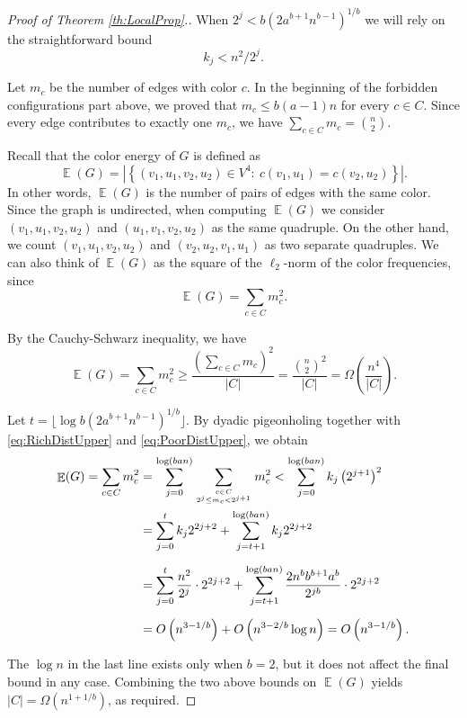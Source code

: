 \documentclass[11pt]{article}
\newcommand{\parag}[1]{\vspace{2mm}

\noindent{\bf #1} }
\DeclareMathOperator*{\EE}{\mathbb{E}}
\begin{document}
\begin{proof}[Proof of Theorem \ref{th:LocalProp}.]
When $2^j< b(2a^{b+1}n^{b-1})^{1/b}$ we will rely on the straightforward bound
%
\begin{equation} \label{eq:PoorDistUpper}
k_j < n^2/2^j.
\end{equation}

\parag{An energy argument.}
Let $m_c$ be the number of edges with color $c$.
In the beginning of the forbidden configurations part above, we proved that $m_c \le b(a-1)n$ for every $c\in C$.
Since every edge contributes to exactly one $m_c$, we have $\sum_{c\in C} m_c = \binom{n}{2}$.

Recall that the color energy of $G$ is defined as
%
\begin{equation*}
\EE(G) = \left|\left\{(v_1,u_1,v_2,u_2)\in V^{4} :\ c(v_1,u_1)=c(v_2,u_2)\right\}\right|.
\end{equation*}
%
In other words, $\EE(G)$ is the number of pairs of edges with the same color.
Since the graph is undirected, when computing $\EE(G)$ we consider $(v_1,u_1,v_2,u_2)$ and $(u_1,v_1,v_2,u_2)$ as the same quadruple.
On the other hand, we count $(v_1,u_1,v_2,u_2)$ and $(v_2,u_2,v_1,u_1)$ as two separate quadruples.
We can also think of $\EE(G)$ as the square of the $\ell_2$-norm of the color frequencies, since
%
\[ \EE(G) = \sum_{c \in C} m_c^2. \]

By the Cauchy-Schwarz inequality, we have
%
\[ \EE(G) = \sum_{c\in C} m_c^2 \ge \frac{\left(\sum_{c\in C} m_c\right)^2}{|C|} = \frac{\binom{n}{2}^2}{|C|} = \Omega\left( \frac{n^4}{|C|}\right). \]

Let $t = \lfloor \log b(2a^{b+1}n^{b-1})^{1/b} \rfloor$.
By dyadic pigeonholing together with \eqref{eq:RichDistUpper} and \eqref{eq:PoorDistUpper}, we obtain
%
\begin{align*}
\EE(G) = \sum_{c\in C} m_c^2 &= \sum_{j=0}^{\log (ban)} \sum_{c\in C \atop 2^{j} \le m_c <2^{j+1} } m_c^2 < \sum_{j=0}^{\log (ban)} k_j \left(2^{j+1}\right)^2 \\
&= \sum_{j=0}^{t} k_j 2^{2j+2} + \sum_{j=t+1}^{\log (ban)} k_j 2^{2j+2} \\[2mm]
&= \sum_{j=0}^{t} \frac{n^2}{2^j} \cdot 2^{2j+2} + \sum_{j=t+1}^{\log (ban)} \frac{2n^b b^{b+1}a^b}{2^{jb}} \cdot  2^{2j+2} \\[2mm]
&= O\left(n^{3-1/b}\right)+O\left(n^{3-2/b}\log n\right) = O\left(n^{3-1/b}\right).
\end{align*}

The $\log n$ in the last line exists only when $b=2$, but it does not affect the final bound in any case.
Combining the two above bounds on $\EE(G)$ yields $|C|=\Omega(n^{1+1/b})$, as required.
%
\end{proof}
\end{document}
